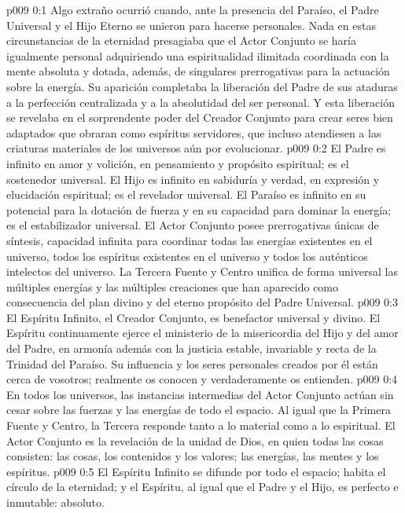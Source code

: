 \author{Consejero divino}
\vs p009 0:1 Algo extraño ocurrió cuando, ante la presencia del Paraíso, el Padre Universal y el Hijo Eterno se unieron para hacerse personales. Nada en estas circunstancias de la eternidad presagiaba que el Actor Conjunto se haría igualmente personal adquiriendo una espiritualidad ilimitada coordinada con la mente absoluta y dotada, además, de singulares prerrogativas para la actuación sobre la energía. Su aparición completaba la liberación del Padre de sus ataduras a la perfección centralizada y a la absolutidad del ser personal. Y esta liberación se revelaba en el sorprendente poder del Creador Conjunto para crear seres bien adaptados que obraran como espíritus servidores, que incluso atendiesen a las criaturas materiales de los universos aún por evolucionar.
\vs p009 0:2 \pc El Padre es infinito en amor y volición, en pensamiento y propósito espiritual; es el sostenedor universal. El Hijo es infinito en sabiduría y verdad, en expresión y elucidación espiritual; es el revelador universal. El Paraíso es infinito en su potencial para la dotación de fuerza y en su capacidad para dominar la energía; es el estabilizador universal. El Actor Conjunto posee prerrogativas únicas de síntesis, capacidad infinita para coordinar todas las energías existentes en el universo, todos los espíritus existentes en el universo y todos los auténticos intelectos del universo. La Tercera Fuente y Centro unifica de forma universal las múltiples energías y las múltiples creaciones que han aparecido como consecuencia del plan divino y del eterno propósito del Padre Universal.
\vs p009 0:3 El Espíritu Infinito, el Creador Conjunto, es benefactor universal y divino. El Espíritu continuamente ejerce el ministerio de la misericordia del Hijo y del amor del Padre, en armonía además con la justicia estable, invariable y recta de la Trinidad del Paraíso. Su influencia y los seres personales creados por él están cerca de vosotros; realmente os conocen y verdaderamente os entienden.
\vs p009 0:4 En todos los universos, las instancias intermedias del Actor Conjunto actúan sin cesar sobre las fuerzas y las energías de todo el espacio. Al igual que la Primera Fuente y Centro, la Tercera responde tanto a lo material como a lo espiritual. El Actor Conjunto es la revelación de la unidad de Dios, en quien todas las cosas consisten: las cosas, los contenidos y los valores; las energías, las mentes y los espíritus.
\vs p009 0:5 \pc El Espíritu Infinito se difunde por todo el espacio; habita el círculo de la eternidad; y el Espíritu, al igual que el Padre y el Hijo, es perfecto e inmutable: absoluto.
